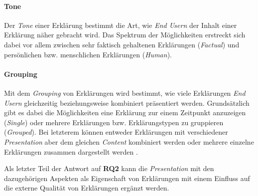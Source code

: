\paragraph{Tone} Der \textit{Tone} einer Erklärung bestimmt die Art, wie \textit{End Usern} der Inhalt einer Erklärung näher gebracht wird. Das Spektrum der Möglichkeiten erstreckt sich dabei vor allem zwischen sehr faktisch gehaltenen Erklärungen (\textit{Factual}) und persönlichen bzw. menschlichen Erklärungen (\textit{Human}).

\paragraph{Grouping} Mit dem \textit{Grouping} von Erklärungen wird bestimmt, wie viele Erklärungen \textit{End Usern} gleichzeitig beziehungsweise kombiniert präsentiert werden. Grundsätzlich gibt es dabei die Möglichkeiten eine Erklärung zur einem Zeitpunkt anzuzeigen (\textit{Single}) oder mehrere Erklärungen bzw. Erklärungstypen zu gruppieren (\textit{Grouped}). Bei letzterem können entweder Erklärungen mit verschiedener \textit{Presentation} aber dem gleichen \textit{Content} kombiniert werden \cite{kouki_user_2017} oder mehrere einzelne Erklärungen zusammen dargestellt werden \cite{balog_measuring_2020}.

\bigskip

Als letzter Teil der Antwort auf \textbf{RQ2} kann die \textit{Presentation} mit den dazugehörigen Aspekten als Eigenschaft von Erklärungen mit einem Einfluss auf die externe Qualität von Erklärungen ergänzt werden.

\newpage

